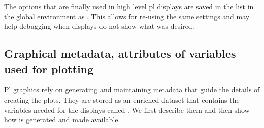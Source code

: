 \documentclass[11pt]{article}\usepackage[]{graphicx}\usepackage[]{color}
\begin{document}
The options that are finally used in high level pl displays are saved 
in the list  in the global environment as
.
This allows for re-using the same settings and may help debugging when
displays do not show what was desired.

\subsection{Graphical metadata, attributes of variables used for plotting}
\label{plproperties}
Pl graphics rely on generating and maintaining metadata that guide the
details of creating the plots. 
They are stored as an enriched dataset that contains the variables needed
for the displays called . We first describe them and then show
how  is generated and made available.
\end{document}

